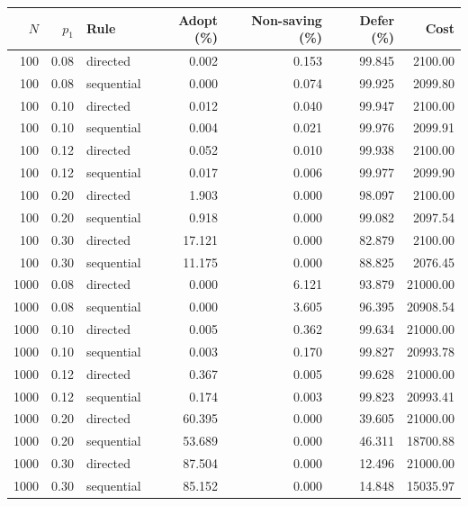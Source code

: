 \begin{tabular}{rrlrrrr}
\toprule
$N$ & $p_1$ & Rule & Adopt (\%) & Non-saving (\%) & Defer (\%) & Cost\\
\midrule
100 & 0.08 & directed & 0.002 & 0.153 & 99.845 & 2100.00\\
100 & 0.08 & sequential & 0.000 & 0.074 & 99.925 & 2099.80\\
100 & 0.10 & directed & 0.012 & 0.040 & 99.947 & 2100.00\\
100 & 0.10 & sequential & 0.004 & 0.021 & 99.976 & 2099.91\\
100 & 0.12 & directed & 0.052 & 0.010 & 99.938 & 2100.00\\
100 & 0.12 & sequential & 0.017 & 0.006 & 99.977 & 2099.90\\
100 & 0.20 & directed & 1.903 & 0.000 & 98.097 & 2100.00\\
100 & 0.20 & sequential & 0.918 & 0.000 & 99.082 & 2097.54\\
100 & 0.30 & directed & 17.121 & 0.000 & 82.879 & 2100.00\\
100 & 0.30 & sequential & 11.175 & 0.000 & 88.825 & 2076.45\\
1000 & 0.08 & directed & 0.000 & 6.121 & 93.879 & 21000.00\\
1000 & 0.08 & sequential & 0.000 & 3.605 & 96.395 & 20908.54\\
1000 & 0.10 & directed & 0.005 & 0.362 & 99.634 & 21000.00\\
1000 & 0.10 & sequential & 0.003 & 0.170 & 99.827 & 20993.78\\
1000 & 0.12 & directed & 0.367 & 0.005 & 99.628 & 21000.00\\
1000 & 0.12 & sequential & 0.174 & 0.003 & 99.823 & 20993.41\\
1000 & 0.20 & directed & 60.395 & 0.000 & 39.605 & 21000.00\\
1000 & 0.20 & sequential & 53.689 & 0.000 & 46.311 & 18700.88\\
1000 & 0.30 & directed & 87.504 & 0.000 & 12.496 & 21000.00\\
1000 & 0.30 & sequential & 85.152 & 0.000 & 14.848 & 15035.97\\
\bottomrule
\end{tabular}
